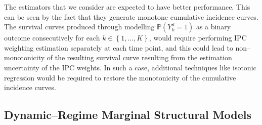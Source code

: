 \documentclass[12pt]{article}
\begin{document}
The estimators that we consider are expected to have better performance. This can be seen by the fact that they generate monotone cumulative incidence curves. The survival curves produced through modelling $\mathbb{P} \left( Y_k^d = 1 \right)$ as a binary outcome consecutively for each $k \in \left\lbrace 1, \dots,K \right\rbrace$, would require performing IPC weighting estimation separately at each time point, and this could lead to non--monotonicity of the resulting survival curve resulting from the estimation uncertainty of the IPC weights. In such a case, additional techniques like isotonic regression \citep{Westling2020} would be required to restore the monotonicity of the cumulative incidence curves.  

\subsection{Dynamic--Regime Marginal Structural Models}
\end{document}
